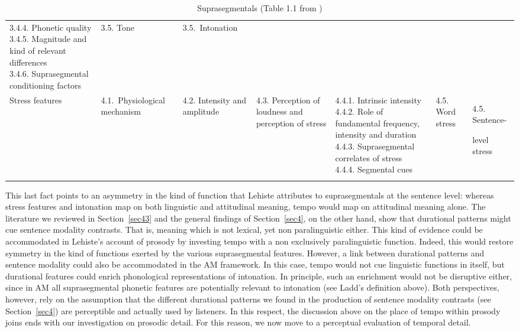 \begin{landscape}
\begin{table}[p]
\begin{tabular}{lp{1.8cm}p{2.7cm}p{2cm}llp{1.6cm}}
{3.4.4. Phonetic quality \\
3.4.5. Magnitude and kind of relevant differences\\
3.4.6. Suprasegmental conditioning factors \\
}
& {3.5. Tone} & \mbox{3.5. Intonation} \\
{Stress features} & {\raggedright  \mbox{4.1. Physiological} \mbox{mechanism}} & {4.2. Intensity and amplitude} & {4.3. Perception of loudness and perception of stress} & \parbox[t]{3cm}{\raggedright 4.4.1. Intrinsic intensity \\
4.4.2. Role of fundamental frequency, intensity and duration\\
4.4.3. Suprasegmental correlates of stress\\
4.4.4. Segmental cues\\
}
& {4.5. Word stress} & {\raggedright 4.5. Sentence-} level stress \\
\mybottomrule
\end{tabular}
\caption{Suprasegmentals (Table 1.1 from \citealt{lehiste1970suprasegmentals})}
\label{tab51}\end{table}
\end{landscape}

This last fact points to an asymmetry in the kind of function that Lehiste attributes to suprasegmentals at the sentence level: whereas stress features and intonation map on both linguistic and attitudinal meaning, tempo would map on attitudinal meaning alone.
The literature we reviewed in Section~\ref{sec43} and the general findings of Section~\ref{sec4}, on the other hand, show that durational patterns might cue sentence modality contrasts. That is, meaning which is not lexical, yet non paralinguistic either. This kind of evidence could be accommodated in Lehiste's account of prosody by investing tempo with a non exclusively paralinguistic function. Indeed, this would restore symmetry in the kind of functions exerted by the various suprasegmental features. However, a link between durational patterns and sentence modality could also be accommodated in the AM framework. In this case, tempo would not cue linguistic functions in itself, but durational features could enrich phonological representations of intonation. In principle, such an enrichment would not be disruptive either, since in AM all suprasegmental phonetic features are potentially relevant to intonation (see Ladd's definition above).
Both perspectives, however, rely on the assumption that the different durational patterns we found in the production of sentence modality contrasts (see Section~\ref{sec4}) are perceptible and actually used by listeners. In this respect, the discussion above on the place of tempo within prosody joins ends with our investigation on prosodic detail. For this reason, we now move to a perceptual evaluation of temporal detail.
